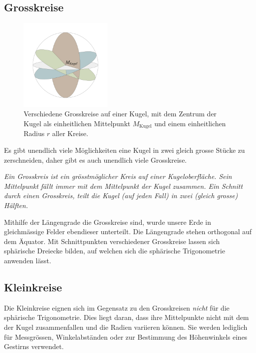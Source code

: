 \begin{refsection}
\subsection{Grosskreise}
\begin{figure}
\centering
\includegraphics[width=0.4\textwidth]{kugel/Grosskreise.jpg}
\caption{Verschiedene Grosskreise auf einer Kugel, mit dem Zentrum der Kugel als einheitlichen Mittelpunkt $M_{\text{Kugel}}$ und einem einheitlichen Radius $r$ aller Kreise.}
\end{figure}

Es gibt unendlich viele Möglichkeiten eine Kugel in zwei gleich grosse Stücke zu zerschneiden, daher gibt es auch unendlich viele Grosskreise.

\begin{definition}
\textit{Ein Grosskreis ist ein grösstmöglicher Kreis auf einer Kugeloberfläche. Sein Mittelpunkt fällt immer mit dem Mittelpunkt der Kugel zusammen. Ein Schnitt durch einen Grosskreis, teilt die Kugel (auf jeden Fall) in zwei (gleich grosse) Hälften.}
\label{skript:kugel:satz:Grosskreis}
\end{definition}

Mithilfe der Längengrade die Grosskreise sind, wurde unsere Erde in gleichmässige Felder ebendieser unterteilt. Die Längengrade stehen orthogonal auf dem Äquator. Mit Schnittpunkten verschiedener Grosskreise lassen sich sphärische Dreiecke bilden, auf welchen sich die sphärische Trigonometrie anwenden lässt.


\subsection{Kleinkreise}
Die Kleinkreise eignen sich im Gegensatz zu den Grosskreisen \textit{nicht} für die sphärische Trigonometrie.  Dies liegt daran, dass ihre Mittelpunkte nicht mit dem der Kugel zusammenfallen und die Radien variieren können.
Sie werden lediglich für Messgrössen, Winkelabständen oder zur Bestimmung des Höhenwinkels eines Gestirns verwendet. 


\end{refsection}
